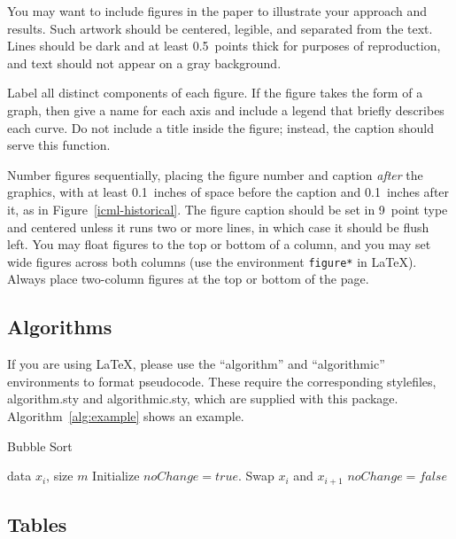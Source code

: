 \documentclass{article}
\begin{document}
You may want to include figures in the paper to illustrate
your approach and results. Such artwork should be centered,
legible, and separated from the text. Lines should be dark and at
least 0.5~points thick for purposes of reproduction, and text should
not appear on a gray background.

Label all distinct components of each figure. If the figure takes the
form of a graph, then give a name for each axis and include a legend
that briefly describes each curve. Do not include a title inside the
figure; instead, the caption should serve this function.

Number figures sequentially, placing the figure number and caption
\emph{after} the graphics, with at least 0.1~inches of space before
the caption and 0.1~inches after it, as in
Figure~\ref{icml-historical}. The figure caption should be set in
9~point type and centered unless it runs two or more lines, in which
case it should be flush left. You may float figures to the top or
bottom of a column, and you may set wide figures across both columns
(use the environment \texttt{figure*} in \LaTeX). Always place
two-column figures at the top or bottom of the page.

\subsection{Algorithms}

If you are using \LaTeX, please use the ``algorithm'' and ``algorithmic''
environments to format pseudocode. These require
the corresponding stylefiles, algorithm.sty and
algorithmic.sty, which are supplied with this package.
Algorithm~\ref{alg:example} shows an example.

\begin{algorithm}[tb]
   \caption{Bubble Sort}
   \label{alg:example}
\begin{algorithmic}
    data $x_i$, size $m$
   \REPEAT
   \STATE Initialize $noChange = true$.
   \STATE Swap $x_i$ and $x_{i+1}$
   \STATE $noChange = false$
   \ENDIF
   \ENDFOR
\end{algorithmic}
\end{algorithm}

\subsection{Tables}
\end{document}
